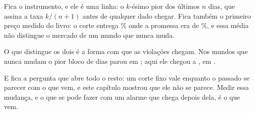 Fica o instrumento, e ele é uma linha: o $k$-ésimo pior dos últimos $n$ dias, que assina a taxa
$k/(n+1)$ antes de qualquer dado chegar. Fica também o primeiro preço medido do livro: o corte
entrega \numCorteContaPct\% onde a promessa era de \numPromessaPct\%, e essa média não distingue
o mercado de um mundo que nunca muda.

O que distingue os dois é a forma com que as violações chegam. Nos mundos que nunca mudam o pior
bloco de \numBlocoDias{} dias parou em \numNuncaMudaPiorBloco; aqui ele chegou a \numBlocoPior, em
\numBlocoPiorData.

E fica a pergunta que abre todo o resto: um corte fixo vale enquanto o passado se parecer com o que
vem, e este capítulo mostrou que ele não se parece. Medir essa mudança, e o que se pode fazer com
um alarme que chega depois dela, é o que vem.
